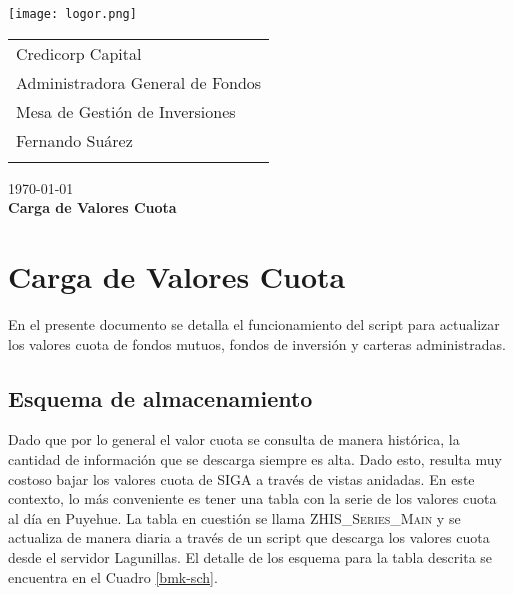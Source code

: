 \documentclass{article}
\begin{document}
\texttt{[image: logor.png]}
\vspace*{-1.55cm}

\hspace*{1.4 cm}
 \hspace*{2.9 cm}
 {\footnotesize
 \begin{tabular}{l}
  \sc Credicorp Capital\\
  \sc Administradora General de Fondos \\
  \sc Mesa de Gestión de Inversiones  \\
  \sc Fernando Suárez  \\
  \vspace{15\baselineskip}\mbox{}
  \vspace{-3mm}\mbox{}
 \end{tabular}
}

 \bigskip

\vspace*{5mm}
\begin{center}
{\today} \\
\vspace{3mm}
{\Large\bf Carga de Valores Cuota} \\
\vspace{2mm}
\end{center}
\section{Carga de Valores Cuota}


En el presente documento se detalla el funcionamiento del script para actualizar los valores cuota de fondos mutuos, fondos de inversión y carteras administradas.


\subsection{Esquema de almacenamiento}


\par Dado que por lo general el valor cuota se consulta de manera histórica, la cantidad de información que se descarga siempre es alta. Dado esto, resulta muy costoso bajar los valores cuota de SIGA a través de vistas anidadas. En este contexto, lo más conveniente es tener una tabla con la serie de los valores cuota al día en Puyehue. La tabla en cuestión se llama \textsc{ZHIS\_Series\_Main} y se actualiza de manera diaria a través de un script que descarga los valores cuota desde el servidor Lagunillas. El detalle de los esquema para la tabla descrita se encuentra en el Cuadro \ref{bmk-sch}.
\end{document}
